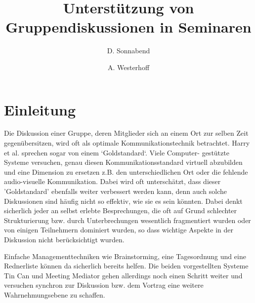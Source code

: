 \documentclass{seminarvorlage}
\begin{document}
\title{Unterstützung von Gruppendiskussionen in Seminaren}
\author{
  \alignauthor D. Sonnabend\\
    \and
  \alignauthor A. Westerhoff\\
}

\maketitle




\section{Einleitung}
Die Diskussion einer Gruppe, deren Mitglieder sich an einem Ort zur selben Zeit
gegenübersitzen, wird oft als optimale Kommunikationstechnik betrachtet. Harry
et al. \cite{HarGorSch2012} sprechen sogar von einem `Goldstandard`. Viele
Computer- gestützte Systeme versuchen, genau diesen Kommunikationsstandard
virtuell abzubilden und eine Dimension zu ersetzen z.B. den unterschiedlichen
Ort oder die fehlende audio-visuelle Kommunikation. Dabei wird oft unterschätzt,
dass dieser 'Goldstandard' ebenfalls weiter verbessert werden kann, denn auch
solche Diskussionen sind häufig nicht so effektiv, wie sie es sein könnten.
Dabei denkt sicherlich jeder an selbst erlebte Besprechungen, die oft auf Grund schlechter
Strukturierung bzw. durch Unterbrechungen wesentlich fragmentiert wurden oder
von einigen Teilnehmern dominiert wurden, so dass wichtige Aspekte in der
Diskussion nicht berücksichtigt wurden.

Einfache Managementtechniken wie Brainstorming, eine Tagesordnung und eine
Rednerliste können da sicherlich bereits helfen.
Die beiden vorgestellten Systeme Tin Can und Meeting Mediator gehen allerdings
noch einen Schritt weiter und versuchen synchron zur Diskussion bzw. dem Vortrag
eine weitere Wahrnehmungsebene zu schaffen.
\end{document}
